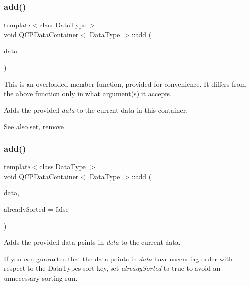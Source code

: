 \subsubsection{\texorpdfstring{add()}{add()}\hspace{0.1cm}{\footnotesize\ttfamily [1/3]}}
{\footnotesize\ttfamily template$<$class Data\+Type $>$ \\
void \hyperlink{classQCPDataContainer}{Q\+C\+P\+Data\+Container}$<$ Data\+Type $>$\+::add (\begin{DoxyParamCaption}\item[{const \hyperlink{classQCPDataContainer}{Q\+C\+P\+Data\+Container}$<$ Data\+Type $>$ \&}]{data }\end{DoxyParamCaption})}

This is an overloaded member function, provided for convenience. It differs from the above function only in what argument(s) it accepts.

Adds the provided {\itshape data} to the current data in this container.

\begin{DoxySeeAlso}{See also}
\hyperlink{classQCPDataContainer_ae7042bd534fc3ce7befa2ce3f790b5bf}{set}, \hyperlink{classQCPDataContainer_ae5f569a120648b167efa78835f12fd38}{remove} 
\end{DoxySeeAlso}
\mbox{\label{classQCPDataContainer_a51d2a4c9ce4baf5e950b767d26673972}} 
\subsubsection{\texorpdfstring{add()}{add()}\hspace{0.1cm}{\footnotesize\ttfamily [2/3]}}
{\footnotesize\ttfamily template$<$class Data\+Type $>$ \\
void \hyperlink{classQCPDataContainer}{Q\+C\+P\+Data\+Container}$<$ Data\+Type $>$\+::add (\begin{DoxyParamCaption}\item[{const Q\+Vector$<$ Data\+Type $>$ \&}]{data,  }\item[{bool}]{already\+Sorted = {\ttfamily false} }\end{DoxyParamCaption})}

Adds the provided data points in {\itshape data} to the current data.

If you can guarantee that the data points in {\itshape data} have ascending order with respect to the Data\+Type\textquotesingle{}s sort key, set {\itshape already\+Sorted} to true to avoid an unnecessary sorting run.

